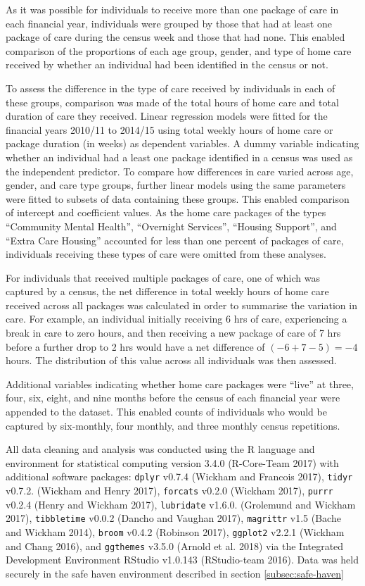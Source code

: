 \documentclass[]{article}
\begin{document}
As it was possible for individuals to receive more than one package of
care in each financial year, individuals were grouped by those that had
at least one package of care during the census week and those that had
none. This enabled comparison of the proportions of each age group,
gender, and type of home care received by whether an individual had been
identified in the census or not.

To assess the difference in the type of care received by individuals in
each of these groups, comparison was made of the total hours of home
care and total duration of care they received. Linear regression models
were fitted for the financial years 2010/11 to 2014/15 using total
weekly hours of home care or package duration (in weeks) as dependent
variables. A dummy variable indicating whether an individual had a least
one package identified in a census was used as the independent
predictor. To compare how differences in care varied across age, gender,
and care type groups, further linear models using the same parameters
were fitted to subsets of data containing these groups. This enabled
comparison of intercept and coefficient values. As the home care
packages of the types ``Community Mental Health'', ``Overnight
Services'', ``Housing Support'', and ``Extra Care Housing'' accounted
for less than one percent of packages of care, individuals receiving
these types of care were omitted from these analyses.

For individuals that received multiple packages of care, one of which
was captured by a census, the net difference in total weekly hours of
home care received across all packages was calculated in order to
summarise the variation in care. For example, an individual initially
receiving 6 hrs of care, experiencing a break in care to zero hours, and
then receiving a new package of care of 7 hrs before a further drop to 2
hrs would have a net difference of \((-6 + 7 - 5) = -4\) hours. The
distribution of this value across all individuals was then assessed.

Additional variables indicating whether home care packages were ``live''
at three, four, six, eight, and nine months before the census of each
financial year were appended to the dataset. This enabled counts of
individuals who would be captured by six-monthly, four monthly, and
three monthly census repetitions.

All data cleaning and analysis was conducted using the R language and
environment for statistical computing version 3.4.0 (R-Core-Team 2017)
with additional software packages: \texttt{dplyr} v0.7.4 (Wickham and
Francois 2017), \texttt{tidyr} v0.7.2. (Wickham and Henry 2017),
\texttt{forcats} v0.2.0 (Wickham 2017), \texttt{purrr} v0.2.4 (Henry and
Wickham 2017), \texttt{lubridate} v1.6.0. (Grolemund and Wickham 2017),
\texttt{tibbletime} v0.0.2 (Dancho and Vaughan 2017), \texttt{magrittr}
v1.5 (Bache and Wickham 2014), \texttt{broom} v0.4.2 (Robinson 2017),
\texttt{ggplot2} v2.2.1 (Wickham and Chang 2016), and \texttt{ggthemes}
v3.5.0 (Arnold et al. 2018) via the Integrated Development Environment
RStudio v1.0.143 (RStudio-team 2016). Data was held securely in the safe
haven environment described in section \ref{subsec:safe-haven}
\end{document}
